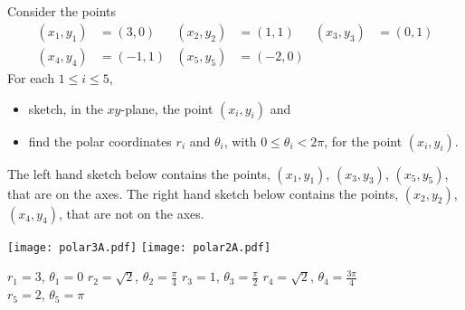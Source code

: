 
\newcommand{\he}{\hat{\mathbf{e}}}


\subsection*{\Conceptual}

\begin{question}
Consider the points
\begin{align*}
(x_1,y_1) &= (3,0) &
(x_2,y_2) &= (1,1)  &
(x_3,y_3) &= (0,1) \\
(x_4,y_4) &= (-1,1) &
(x_5,y_5) &= (-2,0)
\end{align*}
For each $1\le i\le 5$, 
\begin{itemize}
\item
sketch, in the $xy$-plane, the point $(x_i,y_i)$ and
\item
find the polar coordinates $r_i$ and $\theta_i$,
with $0\le\theta_i<2\pi$, for the point $(x_i,y_i)$.
\end{itemize}
\end{question}


\begin{answer} 
The left hand sketch below contains the points, $(x_1,y_1)$, $(x_3,y_3)$,
$(x_5,y_5)$, that are on the axes. The right hand sketch below contains the
points, $(x_2,y_2)$, $(x_4,y_4)$, that are not on the axes.
\begin{center}
  \texttt{[image: polar3A.pdf]}\quad
  \texttt{[image: polar2A.pdf]}
\end{center}
    $r_1 = 3$,        $\theta_1=0$\qquad 
    $r_2 = \sqrt{2}$, $\theta_2=\frac{\pi}{4}$\qquad 
    $r_3 = 1$,        $\theta_3=\frac{\pi}{2}$\qquad 
    $r_4 = \sqrt{2}$, $\theta_4=\frac{3\pi}{4}$\\
    $r_5 = 2$,        $\theta_5=\pi$
\end{answer}


